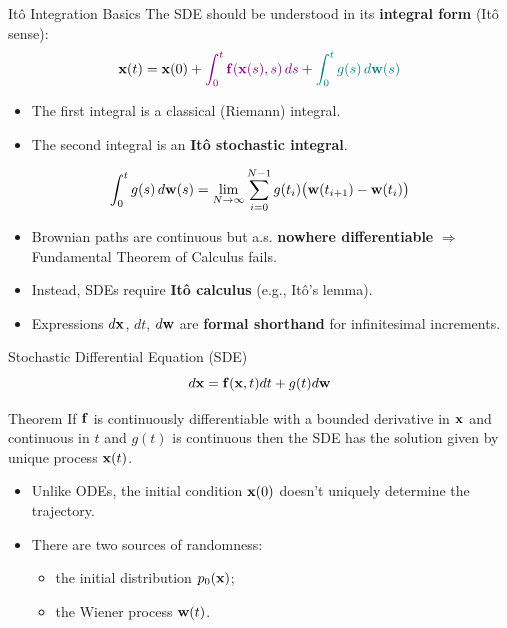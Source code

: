 \documentclass{beamer}
\renewcommand{\eqpause}{}
\begin{document}
\begin{frame}{It\^{o} Integration Basics}
	The SDE should be understood in its \textbf{integral form} (It\^{o} sense):
	\[
		\mathbf{x}(t) = \mathbf{x}(0) + {\color{violet}\int_0^t \mathbf{f}(\mathbf{x}(s), s) \, ds} + {\color{teal}\int_0^t g(s) \, d\mathbf{w}(s)}
	\]
	\eqpause
	\vspace{-0.5cm}
	\begin{itemize}
		\item {\color{violet}The first integral} is a classical (Riemann) integral.
		\item {\color{teal}The second integral} is an \textbf{It\^{o} stochastic integral}.
	\end{itemize}
	\eqpause
	\[
		\int_0^t g(s) \, d\mathbf{w}(s) = \lim_{N \to \infty} \sum_{i=0}^{N-1} g(t_i) \bigl(\mathbf{w}(t_{i+1}) - \mathbf{w}(t_i)\bigr)
	\]
	\vspace{-0.3cm}
	\begin{itemize}
		\item Brownian paths are continuous but a.s. \textbf{nowhere differentiable} $\Rightarrow$ Fundamental Theorem of Calculus fails.
		\item Instead, SDEs require \textbf{It\^{o} calculus} (e.g., It\^{o}'s lemma).
		\item Expressions $d\mathbf{x}$, $dt$, $d\mathbf{w}$ are \textbf{formal shorthand} for infinitesimal increments.
	\end{itemize}
\end{frame}
\begin{frame}{Stochastic Differential Equation (SDE)}
	\[
		d\mathbf{x} = \mathbf{f}(\mathbf{x}, t) dt + g(t) d \mathbf{w}
	\]
	\begin{block}{Theorem}
		If $\mathbf{f}$ is continuously differentiable with a bounded derivative in $\mathbf{x}$ 
		and continuous in $t$ and $g(t)$ is continuous then the SDE has the solution given by unique process $\mathbf{x}(t)$.
	\end{block}
	\eqpause
	\begin{itemize}
		\item Unlike ODEs, the initial condition $\mathbf{x}(0)$ doesn't uniquely determine the trajectory.
		\item There are two sources of randomness: 
		\begin{itemize}
			\item the initial distribution $p_0(\mathbf{x})$;
			\item the Wiener process $\mathbf{w}(t)$.
		\end{itemize}
	\end{itemize}
\end{frame}
\end{document}
